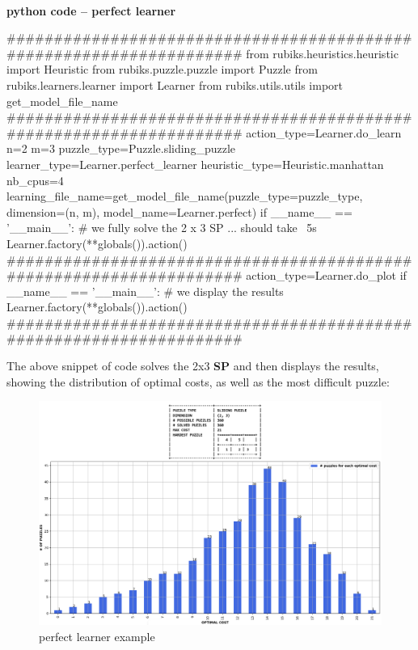 \paragraph{}{\textbf{python code -- perfect learner}}
\begin{python}
####################################################################
from rubiks.heuristics.heuristic import Heuristic
from rubiks.puzzle.puzzle import Puzzle
from rubiks.learners.learner import Learner
from rubiks.utils.utils import get_model_file_name
####################################################################
action_type=Learner.do_learn
n=2
m=3
puzzle_type=Puzzle.sliding_puzzle
learner_type=Learner.perfect_learner
heuristic_type=Heuristic.manhattan
nb_cpus=4
learning_file_name=get_model_file_name(puzzle_type=puzzle_type,
                                       dimension=(n, m),
                                       model_name=Learner.perfect)
if __name__ == '__main__':
    # we fully solve the 2 x 3 SP ... should take ~5s
    Learner.factory(**globals()).action()
####################################################################
action_type=Learner.do_plot
if __name__ == '__main__':
    # we display the results
    Learner.factory(**globals()).action()
####################################################################
\end{python}
\black
The above snippet of code solves the 2x3 \textbf{SP} and then displays the results, showing the distribution of optimal costs, as well as the most difficult puzzle:

\begin{figure}[H]
\centering
\includegraphics[scale=0.41]{./Figures/exampleperfectlearner}
\caption[Examples]{perfect learner example}
\label{fig:exampleperfectlearner}
\end{figure}


